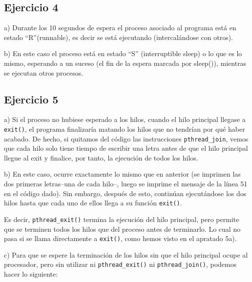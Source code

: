 \documentclass{article}
\begin{document}
\subsection*{Ejercicio 4}

a) Durante los 10 segundos de espera el proceso asociado al programa está en estado ``R''(runnable), es decir se está ejecutando (intercalándose con otros).

b) En este caso el proceso está en estado ``S'' (interruptible sleep) o lo que es lo mismo, esperando a un suceso (el fin de la espera marcada por sleep()), mientras se ejecutan otros procesos.


\subsection*{Ejercicio 5}\label{ej5}

a) Si el proceso no hubiese esperado a los hilos, cuando el hilo principal llegase a \texttt{exit()}, el programa finalizaría matando los hilos que no tendrían por qué haber acabado. De hecho, si quitamos del código las instrucciones \texttt{pthread\_join}, vemos que cada hilo solo tiene tiempo de escribir una letra antes de que el hilo principal llegue al exit y finalice, por tanto, la ejecución de todos los hilos.

b) En este caso, ocurre exactamente lo mismo que en anterior (se imprimen las dos primeras letras--una de cada hilo--, luego se imprime el mensaje de la línea 51 en el código dado). Sin embargo, después de esto, continúan ejecutándose los dos hilos hasta que cada uno de ellos llega a su función \texttt{exit()}.

Es decir, \texttt{pthread\_exit()} termina la ejecución del hilo principal, pero permite que se terminen todos los hilos que del proceso antes de terminarlo. Lo cual no pasa si se llama directamente a \texttt{exit()}, como hemos visto en el apratado 5a).

c) Para que se espere la terminación de los hilos sin que el hilo principal ocupe al procesador, pero sin utilizar ni \texttt{pthread\_exit()} ni \texttt{pthread\_join()}, podemos hacer lo siguiente:
\end{document}

